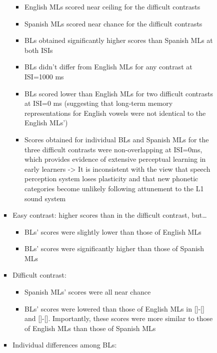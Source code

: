 \documentclass[
]{article}
\providecommand{\tightlist}{%
  \setlength{\itemsep}{0pt}\setlength{\parskip}{0pt}}
\begin{document}
\begin{itemize}
\begin{itemize}
\begin{itemize}
\begin{itemize}
        \begin{itemize}
        \tightlist
        \item
          English MLs scored near ceiling for the difficult contrasts
        \item
          Spanish MLs scored near chance for the difficult contrasts
        \item
          BLs obtained significantly higher scores than Spanish MLs at
          both ISIs
        \item
          BLs didn't differ from English MLs for any contrast at
          ISI=1000 ms
        \item
          BLs scored lower than English MLs for two difficult contrasts
          at ISI=0 ms (suggesting that long-term memory representations
          for English vowels were not identical to the English MLs')
        \item
          Scores obtained for individual BLs and Spanish MLs for the
          three difficult contrasts were non-overlapping at ISI=0ms,
          which provides evidence of extensive perceptual learning in
          early learners -\textgreater{} It is inconsistent with the
          view that speech perception system loses plasticity and that
          new phonetic categories become unlikely following attunement
          to the L1 sound system
        \end{itemize}
      \item
        Easy contrast: higher scores than in the difficult contrast,
        but\ldots{}

        \begin{itemize}
        \tightlist
        \item
          BLs' scores were slightly lower than those of English MLs
        \item
          BLs' scores were significantly higher than those of Spanish
          MLs
        \end{itemize}
      \item
        Difficult contrast:

        \begin{itemize}
        \tightlist
        \item
          Spanish MLs' scores were all near chance
        \item
          BLs' scores were lowered than those of English MLs in
          {[}{]}-{[}{]} and {[}{]}-{[}{]}. Importantly, these scores
          were more similar to those of English MLs than those of
          Spanish MLs
        \end{itemize}
      \item
        Individual differences among BLs:


\end{itemize}
\end{itemize}
\end{itemize}
\end{itemize}
\end{document}
